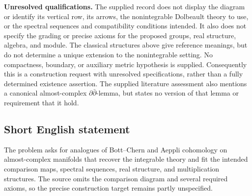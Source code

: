 \documentclass[11pt]{article}
\begin{document}
\textbf{Unresolved qualifications.} The supplied record does not display the diagram or identify its vertical row, its arrows, the nonintegrable Dolbeault theory to use, or the spectral sequences and compatibility conditions intended. It also does not specify the grading or precise axioms for the proposed groups, real structure, algebra, and module. The classical structures above give reference meanings, but do not determine a unique extension to the nonintegrable setting. No compactness, boundary, or auxiliary metric hypothesis is supplied. Consequently this is a construction request with unresolved specifications, rather than a fully determined existence assertion. The supplied literature assessment also mentions a canonical almost-complex \(\partial\bar\partial\)-lemma, but states no version of that lemma or requirement that it hold.
\subsection{Short English statement}
The problem asks for analogues of Bott--Chern and Aeppli cohomology on almost-complex manifolds that recover the integrable theory and fit the intended comparison maps, spectral sequences, real structure, and multiplication structures. The source omits the comparison diagram and several required axioms, so the precise construction target remains partly unspecified.
\end{document}
